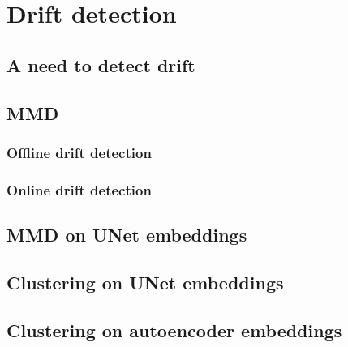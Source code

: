 \section{Drift detection}
    \subsection{A need to detect drift}
    \subsection{MMD}
        \subsubsection{Offline drift detection}
        \subsubsection{Online drift detection}
    \subsection{MMD on UNet embeddings}
    \subsection{Clustering on UNet embeddings}
    \subsection{Clustering on autoencoder embeddings}